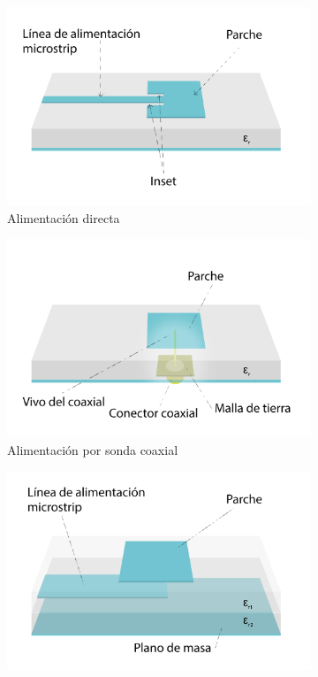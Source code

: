 \begin{figure}[h]
     \centering
     \begin{subfigure}[b]{0.4\textwidth}
         \centering
         \includegraphics[width=\textwidth]{archivos/parche/directa}
         \caption{Alimentación directa}
         \label{fig:directa}
     \end{subfigure}
     \hfill
     \begin{subfigure}[b]{0.4\textwidth}
         \centering
         \includegraphics[width=\textwidth]{archivos/parche/coax}
         \caption{Alimentación por sonda coaxial}
         \label{fig:coax}
     \end{subfigure}
     \hfill
     \begin{subfigure}[b]{0.4\textwidth}
         \centering
         \includegraphics[width=\textwidth]{archivos/parche/proximidad}

\end{subfigure}
\end{figure}

